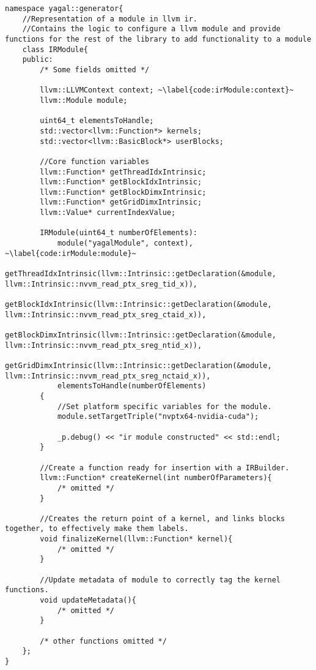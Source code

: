 \begin{lstlisting}[caption={The IRModule class.}, label={code:irModule}]
namespace yagal::generator{
    //Representation of a module in llvm ir.
    //Contains the logic to configure a llvm module and provide functions for the rest of the library to add functionality to a module
    class IRModule{
    public:
        /* Some fields omitted */

        llvm::LLVMContext context; ~\label{code:irModule:context}~
        llvm::Module module;

        uint64_t elementsToHandle;
        std::vector<llvm::Function*> kernels;
        std::vector<llvm::BasicBlock*> userBlocks;

        //Core function variables
        llvm::Function* getThreadIdxIntrinsic;
        llvm::Function* getBlockIdxIntrinsic;
        llvm::Function* getBlockDimxIntrinsic;
        llvm::Function* getGridDimxIntrinsic;
        llvm::Value* currentIndexValue;

        IRModule(uint64_t numberOfElements): 
            module("yagalModule", context), ~\label{code:irModule:module}~
            getThreadIdxIntrinsic(llvm::Intrinsic::getDeclaration(&module, llvm::Intrinsic::nvvm_read_ptx_sreg_tid_x)),
            getBlockIdxIntrinsic(llvm::Intrinsic::getDeclaration(&module, llvm::Intrinsic::nvvm_read_ptx_sreg_ctaid_x)),
            getBlockDimxIntrinsic(llvm::Intrinsic::getDeclaration(&module, llvm::Intrinsic::nvvm_read_ptx_sreg_ntid_x)),
            getGridDimxIntrinsic(llvm::Intrinsic::getDeclaration(&module, llvm::Intrinsic::nvvm_read_ptx_sreg_nctaid_x)),
            elementsToHandle(numberOfElements)
        {
            //Set platform specific variables for the module.
            module.setTargetTriple("nvptx64-nvidia-cuda");

            _p.debug() << "ir module constructed" << std::endl;
        }

        //Create a function ready for insertion with a IRBuilder.
        llvm::Function* createKernel(int numberOfParameters){
            /* omitted */
        }

        //Creates the return point of a kernel, and links blocks together, to effectively make them labels.
        void finalizeKernel(llvm::Function* kernel){
            /* omitted */
        }

        //Update metadata of module to correctly tag the kernel functions.
        void updateMetadata(){
            /* omitted */
        }

        /* other functions omitted */
    };
}
\end{lstlisting}

